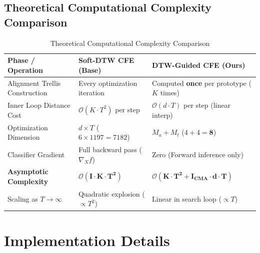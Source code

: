 \documentclass[11pt,a4paper]{report}
\begin{document}
\section{Theoretical Computational Complexity Comparison}
\begin{table}[h!]
    \centering
    \caption{Theoretical Computational Complexity Comparison}
    \label{tab:complexity_comparison}
    \begin{tabular}{lll}
        \toprule
        \textbf{Phase / Operation} & \textbf{Soft-DTW CFE (Base)} & \textbf{DTW-Guided CFE (Ours)} \\
        \midrule
        Alignment Trellis Construction & Every optimization iteration & Computed \textbf{once} per prototype ($K$ times) \\
        Inner Loop Distance Cost & $\mathcal{O}(K \cdot T^2)$ per step & $\mathcal{O}(d \cdot T)$ per step (linear interp) \\
        Optimization Dimension & $d \times T$ ($6 \times 1197 = 7182$) & $M_a + M_t$ ($4 + 4 = \mathbf{8}$) \\
        Classifier Gradient & Full backward pass ($\nabla_X f$) & Zero (Forward inference only) \\
        \textbf{Asymptotic Complexity} & $\mathbf{\mathcal{O}(I \cdot K \cdot T^2)}$ & $\mathbf{\mathcal{O}(K \cdot T^2 + I_{\text{CMA}} \cdot d \cdot T)}$ \\
        Scaling as $T \rightarrow \infty$ & Quadratic explosion ($\propto T^2$) & Linear in search loop ($\propto T$) \\
        \bottomrule
    \end{tabular}
\end{table}

\chapter{Implementation Details}
\end{document}
